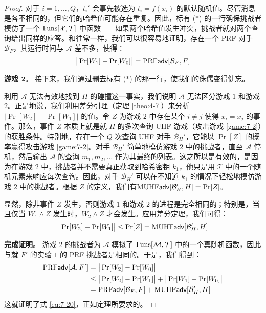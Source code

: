 \begin{proof}
\vspace{5pt}

\noindent
对于 $i = 1,\dots,Q$，$t_i'$ 会事先被选为 $t_i=f(x_i)$ 的默认随机值。尽管消息是各不相同的，但它们的哈希值可能存在重复。因此，标有 ($*$) 的一行确保挑战者模仿了一个 ${\rm Funs}[\mathcal{X},\mathcal{T}]$ 中函数——如果两个哈希值发生冲突，挑战者就对两个查询给出同样的应答。和往常一样，我们可以很容易地证明，存在一个 PRF 对手 $\mathcal{B}_F$，其运行时间与 $\mathcal{A}$ 差不多，使得：
\begin{equation}\label{eq:7-21}
\big\lvert\Pr[W_1]-\Pr[W_0]\big\rvert={\rm PRF}\mathsf{adv}[\mathcal{B}_F,F]
\end{equation}

\noindent\textbf{游戏 $\mathbf{2}$}。
接下来，我们通过删去标有 ($*$) 的那一行，使我们的侏儒变得健忘。

利用 $\mathcal{A}$ 无法有效地找到 $H$ 的碰撞这一事实，我们说明 $\mathcal{A}$ 无法区分游戏 $1$ 和游戏 $2$。正是地说，我们利用差分引理（定理 \ref{theo:4-7}）来分析 $|\Pr[W_2]-\Pr[W_1]|$ 的值。令 $Z$ 为游戏 $2$ 中存在某个 $i\neq j$ 使得 $x_i=x_j$ 的事件。那么，事件 $Z$ 本质上就是就 $H$ 的多次查询 UHF 游戏（攻击游戏 \ref{game:7-2}）的获胜条件。特别地，存在一个 $Q$ 次查询 UHF 对手 $\mathcal{B}_H'$，它能以 $\Pr[Z]$ 的概率赢得攻击游戏 \ref{game:7-2}。对手 $\mathcal{B}_H'$ 简单地模仿游戏 $2$ 中的挑战者，直至 $\mathcal{A}$ 停机，然后输出 $\mathcal{A}$ 的查询 $m_1,m_2,\dots$ 作为其最终的列表。这之所以是有效的，是因为在游戏 $2$ 中，挑战者并不需要真正获取到哈希密钥 $k_1$，他只是用 $\mathcal{T}$ 中的一个随机元素来响应每次查询。因此，对手 $\mathcal{B}_H'$ 可以在不知道 $k_1$ 的情况下轻松地模仿游戏 $2$ 中的挑战者。根据 $Z$ 的定义，我们有${\rm MUHF}\mathsf{adv}[\mathcal{B}_H',H]=\Pr[Z]$。

显然，除非事件 $Z$ 发生，否则游戏 $1$ 和游戏 $2$ 的进程是完全相同的；特别是，当且仅当 $W_1\land\bar{Z}$ 发生时，$W_2\land\bar{Z}$ 才会发生。应用差分定理，我们可得：
\begin{equation}\label{eq:7-22}
\big\lvert\Pr[W_2]-\Pr[W_1]\big\rvert\leq\Pr[Z]={\rm MUHF}\mathsf{adv}[\mathcal{B}_H',H]
\end{equation}

\noindent\textbf{完成证明}。
游戏 $2$ 的挑战者为 $\mathcal{A}$ 模拟了 ${\rm Funs}[\mathcal{M},\mathcal{T}]$ 中的一个真随机函数，因此与就 $F'$ 的实验 $1$ 的 PRF 挑战者是相同的。于是，我们得到：
\[
\begin{aligned}
{\rm PRF}\mathsf{adv}[\mathcal{A},F']
&=\big\lvert\Pr[W_2]-\Pr[W_0]\big\rvert\\
&\leq\big\lvert\Pr[W_2]-\Pr[W_1]\big\rvert+\big\lvert\Pr[W_1]-\Pr[W_0]\big\rvert\\
&={\rm PRF}\mathsf{adv}[\mathcal{B}_F,F]+{\rm MUHF}\mathsf{adv}[\mathcal{B}_H',H]
\end{aligned}
\]
这就证明了式 \ref{eq:7-20}，正如定理所要求的。
\end{proof}

